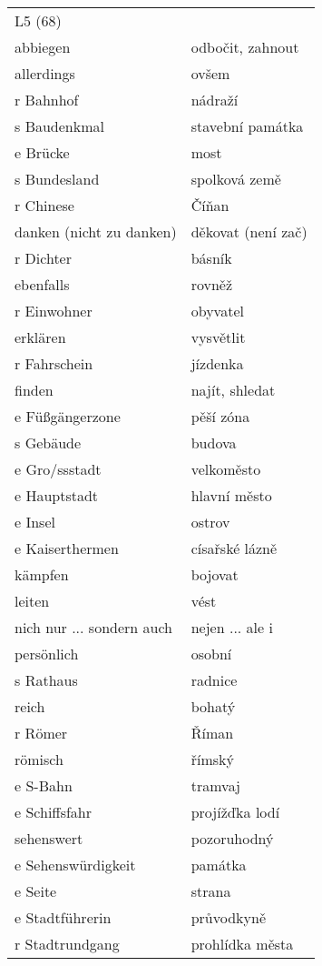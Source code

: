 \documentclass{article}
\begin{document}
\begin{tabular}{ p{5cm}|p{5cm}  }
    \\
    L5 (68) \\
    abbiegen & odbočit, zahnout\\
    allerdings & ovšem\\
    r Bahnhof & nádraží\\
    s Baudenkmal & stavební památka\\
    e Brücke & most\\
    s Bundesland & spolková země\\
    r Chinese & Číňan\\
    danken (nicht zu danken) & děkovat (není zač)\\
    r Dichter & básník\\
    ebenfalls & rovněž\\
    r Einwohner & obyvatel\\
    erklären & vysvětlit\\
    r Fahrschein & jízdenka\\
    finden & najít, shledat\\
    e Fü{\ss}gängerzone & pěší zóna\\
    s Gebäude & budova\\
    e Gro{/ss}stadt & velkoměsto\\
    e Hauptstadt & hlavní město\\
    e Insel & ostrov\\
    e Kaiserthermen & císařské lázně\\
    kämpfen & bojovat\\
    leiten & vést\\
    nich nur ... sondern auch & nejen ... ale i\\
    persönlich & osobní\\
    s Rathaus & radnice\\
    reich & bohatý\\
    r Römer & Říman\\
    römisch & římský\\
    e S-Bahn & tramvaj\\
    e Schiffsfahr & projížďka lodí\\
    sehenswert & pozoruhodný\\
    e Sehenswürdigkeit & památka\\
    e Seite & strana\\
    e Stadtführerin & průvodkyně\\
    r Stadtrundgang & prohlídka města\\

\end{tabular}
\end{document}
